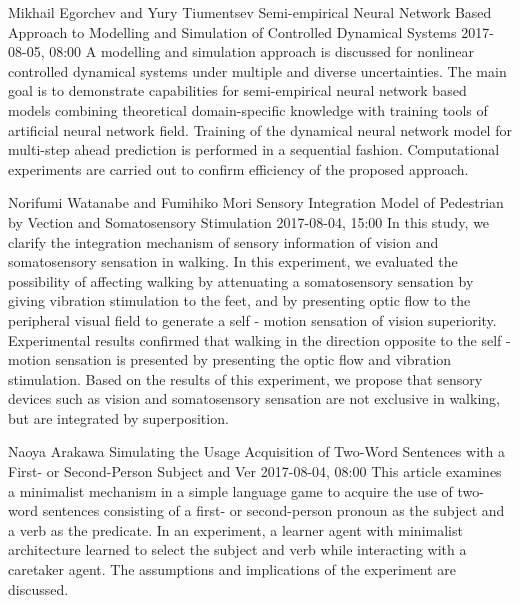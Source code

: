\documentclass[10pt,fleqn,openany]{book} %
\begin{document}
\begin{enumerate}
		
		\paperabstract
		{Mikhail Egorchev and Yury Tiumentsev}
		{Semi-empirical Neural Network Based Approach to Modelling and Simulation of Controlled Dynamical Systems}
		{2017-08-05, 08:00}
		{A modelling and simulation approach is discussed for nonlinear controlled dynamical systems under multiple and diverse uncertainties. The main goal is to demonstrate capabilities for semi-empirical neural network based models combining theoretical domain-specific knowledge with training tools of artificial neural network field. Training of the dynamical neural network model for multi-step ahead prediction is performed in a sequential fashion. Computational experiments are carried out to confirm efficiency of the proposed approach.}
		
		
		\paperabstract
		{Norifumi Watanabe and Fumihiko Mori}
		{Sensory Integration Model of Pedestrian by Vection and Somatosensory Stimulation}
		{2017-08-04, 15:00}
		{In this study, we clarify the integration mechanism of sensory information of vision and somatosensory sensation in walking. In this experiment, we evaluated the possibility of affecting walking by attenuating a somatosensory sensation by giving vibration stimulation to the feet, and by presenting optic flow to the peripheral visual field to generate a self - motion sensation of vision superiority. Experimental results confirmed that walking in the direction opposite to the self - motion sensation is presented by presenting the optic flow and vibration stimulation. Based on the results of this experiment, we propose that sensory devices such as vision and somatosensory sensation are not exclusive in walking, but are integrated by superposition.}
		
		
		\paperabstract
		{Naoya Arakawa}
		{Simulating the Usage Acquisition of Two-Word Sentences with a First- or Second-Person Subject and Ver}
		{2017-08-04, 08:00}
		{This article examines a minimalist mechanism in a simple language game to acquire the use of two-word sentences consisting of a first- or second-person pronoun as the subject and a verb as the predicate.  In an experiment, a learner agent with minimalist architecture learned to select the subject and verb while interacting with a caretaker agent.  The assumptions and implications of the experiment are discussed.}
		

\end{enumerate}
\end{document}
